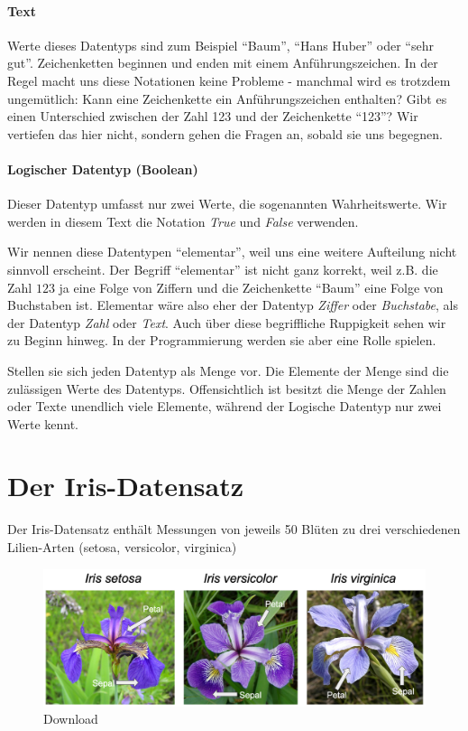 \documentclass[
  oneside]{book}
\begin{document}
\hypertarget{text}{%
\paragraph{Text}\label{text}}

Werte dieses Datentyps sind zum Beispiel ``Baum'', ``Hans Huber'' oder ``sehr gut''. Zeichenketten beginnen und enden mit einem Anführungszeichen. In der Regel macht uns diese Notationen keine Probleme - manchmal wird es trotzdem ungemütlich: Kann eine Zeichenkette ein Anführungszeichen enthalten? Gibt es einen Unterschied zwischen der Zahl 123 und der Zeichenkette ``123''? Wir vertiefen das hier nicht, sondern gehen die Fragen an, sobald sie uns begegnen.

\hypertarget{logischer-datentyp-boolean}{%
\paragraph{Logischer Datentyp (Boolean)}\label{logischer-datentyp-boolean}}

Dieser Datentyp umfasst nur zwei Werte, die sogenannten Wahrheitswerte. Wir werden in diesem Text die Notation \emph{True} und \emph{False} verwenden.

Wir nennen diese Datentypen ``elementar'', weil uns eine weitere Aufteilung nicht sinnvoll erscheint. Der Begriff ``elementar'' ist nicht ganz korrekt, weil z.B. die Zahl \(123\) ja eine Folge von Ziffern und die Zeichenkette ``Baum'' eine Folge von Buchstaben ist. Elementar wäre also eher der Datentyp \emph{Ziffer} oder \emph{Buchstabe}, als der Datentyp \emph{Zahl} oder \emph{Text}. Auch über diese begriffliche Ruppigkeit sehen wir zu Beginn hinweg. In der Programmierung werden sie aber eine Rolle spielen.

Stellen sie sich jeden Datentyp als Menge vor. Die Elemente der Menge sind die zulässigen Werte des Datentyps. Offensichtlich ist besitzt die Menge der Zahlen oder Texte unendlich viele Elemente, während der Logische Datentyp nur zwei Werte kennt.

\hypertarget{der-iris-datensatz}{%
\section{Der Iris-Datensatz}\label{der-iris-datensatz}}

Der Iris-Datensatz enthält Messungen von jeweils 50 Blüten zu drei verschiedenen Lilien-Arten (setosa, versicolor, virginica)

\begin{figure}
\centering
\includegraphics[width=1\textwidth,height=\textheight]{assets/daten.assets/Download.png}
\caption{Download}
\end{figure}
\end{document}
